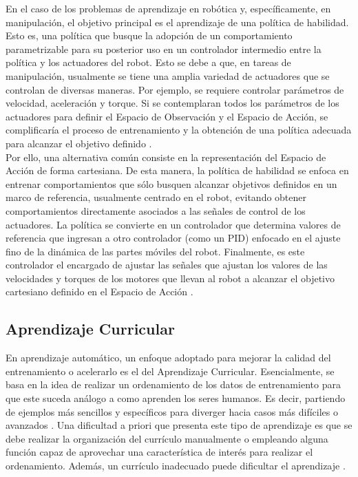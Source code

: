 En el caso de los problemas de aprendizaje en robótica y, específicamente, en manipulación, el objetivo principal es el aprendizaje de una política de habilidad. Esto es, una política que busque la adopción de un comportamiento parametrizable para su posterior uso en un controlador intermedio entre la política y los actuadores del robot. Esto se debe a que, en tareas de manipulación, usualmente se tiene una amplia variedad de actuadores que se controlan de diversas maneras. Por ejemplo, se requiere controlar parámetros de velocidad, aceleración y torque. Si se contemplaran todos los parámetros de los actuadores para definir el Espacio de Observación y el Espacio de Acción, se complificaría el proceso de entrenamiento y la obtención de una política adecuada para alcanzar el objetivo definido \parencite{sutton2018reinforcement}.\\

Por ello, una alternativa común consiste en la representación del Espacio de Acción de forma cartesiana. De esta manera, la política de habilidad se enfoca en entrenar comportamientos que sólo busquen alcanzar objetivos definidos en un marco de referencia, usualmente centrado en el robot, evitando obtener comportamientos directamente asociados a las señales de control de los actuadores. La política se convierte en un controlador que determina valores de referencia que ingresan a otro controlador (como un PID) enfocado en el ajuste fino de la dinámica de las partes móviles del robot. Finalmente, es este controlador el encargado de ajustar las señales que ajustan los valores de las velocidades y torques de los motores que llevan al robot a alcanzar el objetivo cartesiano definido en el Espacio de Acción \parencite{kroemer2021review}.


\subsection{Aprendizaje Curricular}

En aprendizaje automático, un enfoque adoptado para mejorar la calidad del entrenamiento o acelerarlo es el del Aprendizaje Curricular. Esencialmente, se basa en la idea de realizar un ordenamiento de los datos de entrenamiento para que este suceda análogo a como aprenden los seres humanos. Es decir, partiendo de ejemplos más sencillos y específicos para diverger hacia casos más difíciles o avanzados \parencite{nekamiche2023curriculum}. Una dificultad a priori que presenta este tipo de aprendizaje es que se debe realizar la organización del currículo manualmente o empleando alguna función capaz de aprovechar una característica de interés para realizar el ordenamiento. Además, un currículo inadecuado puede dificultar el aprendizaje \parencite{weng2020curriculum}. \\

